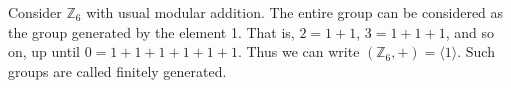         \begin{example}
            Consider $\mathbb{Z}_{6}$ with usual modular addition. The entire
            group can be considered as the group generated by the element 1.
            That is, $2=1+1$, $3=1+1+1$, and so on, up until $0=1+1+1+1+1+1$.
            Thus we can write $(\mathbb{Z}_{6},+)=\langle{1}\rangle$. Such
            groups are called finitely generated.
        \end{example}
